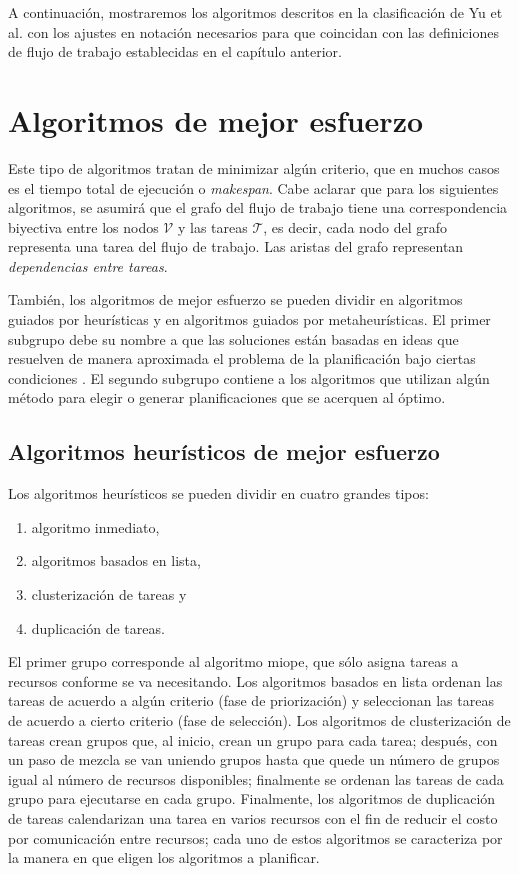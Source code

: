 A continuación, mostraremos los algoritmos descritos en la clasificación de Yu et al. con los ajustes en notación necesarios para que coincidan con las definiciones de flujo de trabajo establecidas en el capítulo anterior.

\section{Algoritmos de mejor esfuerzo}
Este tipo de algoritmos tratan de minimizar algún criterio, que en muchos casos es el tiempo total de ejecución o \emph{makespan}. Cabe aclarar que para los siguientes algoritmos, se asumirá que el grafo del flujo de trabajo tiene una correspondencia biyectiva entre los nodos $\mathcal{V}$ y las tareas $\mathcal{T}$, es decir, cada nodo del grafo representa una tarea del flujo de trabajo. Las aristas del grafo representan \emph{dependencias entre tareas}.

También, los algoritmos de mejor esfuerzo se pueden dividir en algoritmos guiados por heurísticas y en algoritmos guiados por metaheurísticas. El primer subgrupo debe su nombre a que las soluciones están basadas en ideas que resuelven de manera aproximada el problema de la planificación bajo ciertas condiciones \cite{yu2008workflow}. El segundo subgrupo contiene a los algoritmos que utilizan algún método para elegir o generar planificaciones que se acerquen al óptimo.

\subsection{Algoritmos heurísticos de mejor esfuerzo}
Los algoritmos heurísticos se pueden dividir en cuatro grandes tipos: 
\begin{enumerate}
\item{algoritmo inmediato,}
\item{algoritmos basados en lista,}
\item{clusterización de tareas y}
\item{duplicación de tareas.}
\end{enumerate}

El primer grupo corresponde al algoritmo miope, que sólo asigna tareas a recursos conforme se va necesitando. Los algoritmos basados en lista ordenan las tareas de acuerdo a algún criterio (fase de priorización) y seleccionan las tareas de acuerdo a cierto criterio (fase de selección). Los algoritmos de clusterización de tareas crean grupos que, al inicio, crean un grupo para cada tarea; después, con un paso de mezcla se van uniendo grupos hasta que quede un número de grupos igual al número de recursos disponibles; finalmente se ordenan las tareas de cada grupo para ejecutarse en cada grupo. Finalmente, los algoritmos de duplicación de tareas calendarizan una tarea en varios recursos con el fin de reducir el costo por comunicación entre recursos; cada uno de estos algoritmos se caracteriza por la manera en que eligen los algoritmos a planificar.

